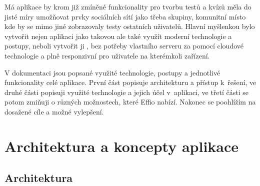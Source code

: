 \documentclass[12pt, a4paper,
openright
]{report}
\begin{document}
Má aplikace by krom již zmíněné funkcionality pro tvorbu testů a kvízů měla do jisté míry umožňovat prvky sociálních sítí jako třeba skupiny, komunitní místo kde by se mimo jiné zobrazovaly testy ostatních uživatelů. Hlavní myšlenkou bylo vytvořit nejen aplikaci jako takovou ale také využít moderní technologie a postupy, neboli vytvořit ji , bez potřeby vlastního serveru za pomocí cloudové technologie  a plně responzivní pro uživatele na kterémkoli zařízení.

V dokumentaci jsou popsané využité technologie, postupy a jednotlivé funkcionality celé aplikace. První část popisuje architekturu a přístup k~řešení, ve druhé části popisuji využité technologie a jejich účel v~aplikaci, ve třetí části se potom zmiňuji o různých možnostech, které Effio nabízí. Nakonec se poohlížím na dosažené cíle a možné vylepšení.



\chapter{Architektura a koncepty aplikace}

\section{Architektura}
\end{document}

